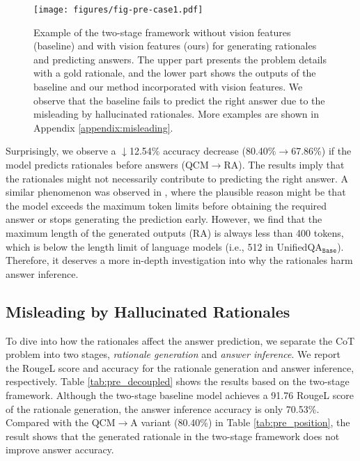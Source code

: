 \documentclass[nohyperref]{article}
\theoremstyle{plain}
\theoremstyle{definition}
\theoremstyle{remark}
\begin{document}
\begin{figure*}[htb]
  \begin{center}
   \texttt{[image: figures/fig-pre-case1.pdf]}
  \end{center}
  \vspace{-3mm}
  \caption{Example of the two-stage framework without vision features (baseline) and with vision features (ours) for generating rationales and predicting answers. The upper part presents the problem details with a gold rationale, and the lower part shows the outputs of the baseline and our method incorporated with vision features. We observe that the baseline fails to predict the right answer due to the misleading by hallucinated rationales. More examples are shown in Appendix \ref{appendix:misleading}.}
    \vspace{-3mm}
  \label{fig_pre_case1}
\end{figure*}

Surprisingly, we observe a $\downarrow$12.54\% accuracy decrease (80.40\%$\rightarrow$67.86\%) if the model predicts rationales before answers (QCM$\rightarrow$RA). The results imply that the rationales might not necessarily contribute to predicting the right answer. A similar phenomenon was observed in \citet{lu2022learn}, where the plausible reason might be that the model exceeds the maximum token limits before obtaining the required answer or stops generating the prediction early. However, we find that the maximum length of the generated outputs (RA) is always less than 400 tokens, which is below the length limit of language models (i.e., 512 in UnifiedQA$_\texttt{Base}$).
Therefore, it deserves a more in-depth investigation into why the rationales harm answer inference.


\subsection{Misleading by Hallucinated Rationales}\label{sec:misleading}
To dive into how the rationales affect the answer prediction, we separate the CoT problem into two stages, \textit{rationale generation} and \textit{answer inference}. We report the RougeL score and accuracy for the rationale generation and answer inference, respectively. Table \ref{tab:pre_decoupled} shows the results based on the two-stage framework. Although the two-stage baseline model achieves a 91.76 RougeL score of the rationale generation, the answer inference accuracy is only 70.53\%. Compared with the QCM$\rightarrow$A variant (80.40\%) in Table \ref{tab:pre_position}, the result shows that the generated rationale in the two-stage framework does not improve answer accuracy.
\end{document}

